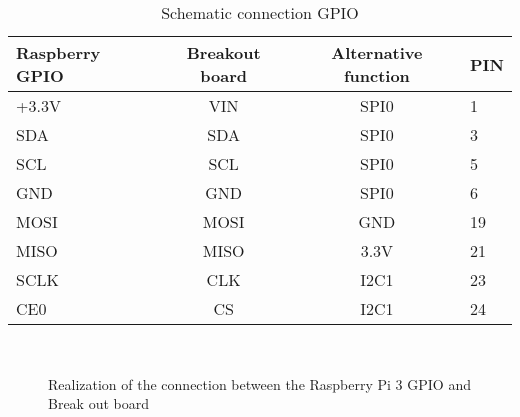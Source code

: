 \begin{table}[!h]
	\centering
	\begin{tabular}{l c c l}
		\hline
		Raspberry GPIO	& Breakout board & 	Alternative function &	PIN \\
		\hline
		+3.3V			& 	VIN			 &	 SPI0 				 &	1	\\
		\rowcolor{aliceblue!85}SDA				& 	SDA			 &	 SPI0 				 &	3	\\
		SCL				& 	SCL			 &	 SPI0 				 &	5	\\
		\rowcolor{aliceblue!85}GND				& 	GND			 &	 SPI0 				 &	6 	\\
		MOSI			& 	MOSI		 &	 GND  				 &	19	\\	
 		\rowcolor{aliceblue!85}MISO			& 	MISO		 &	 3.3V 				 &	21	\\	
 		SCLK			& 	CLK			 &	 I2C1 				 &	23	\\
 		\rowcolor{aliceblue!85}CE0				& 	CS			 &	 I2C1 				 &	24	\\
 		\hline
	\end{tabular}
	\caption{Schematic connection GPIO}
	\label{tab:scheme-gpio}
\end{table}
%
\begin{figure}[htb]
    \centering
     \quad
     \\
    \caption{Realization of the connection between the Raspberry Pi 3 GPIO and Break out board}
    \label{fig:brekout-gpio}
\end{figure}
